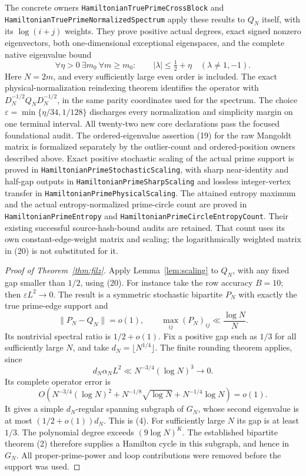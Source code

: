 The concrete owners \texttt{HamiltonianTruePrimeCrossBlock} and
\texttt{HamiltonianTruePrimeNormalizedSpectrum} apply these results
to \(Q_N\) itself, with its \(\log(i+j)\) weights.
They prove positive actual degrees, exact signed nonzero eigenvectors,
both one-dimensional exceptional eigenspaces, and the complete
native eigenvalue bound
\[
 \forall\eta>0\ \exists m_0\ \forall m\geq m_0:\qquad
 |\lambda|\leq\tfrac12+\eta\quad(\lambda\ne1,-1).
\]
Here \(N=2m\), and every sufficiently large even order is included.
The exact physical-normalization reindexing theorem identifies
the operator with \(D_N^{-1/2}Q_ND_N^{-1/2}\), in the same parity
coordinates used for the spectrum.
The choice \(\varepsilon=\min\{\eta/34,1/128\}\) discharges every
normalization and simplicity margin on one terminal interval.
All twenty-two new core declarations pass the focused foundational
audit. The ordered-eigenvalue assertion (19) for the raw Mangoldt
matrix is formalized separately by the outlier-count and ordered-position
owners described above.
Exact positive stochastic scaling of the actual prime support is
proved in \texttt{HamiltonianPrimeStochasticScaling}, with sharp
near-identity and half-gap outputs in
\texttt{HamiltonianPrimeSharpScaling} and lossless integer-vertex
transfer in \texttt{HamiltonianPrimePhysicalScaling}.
The attained entropy maximum and the actual entropy-normalized
prime-circle count are proved in
\texttt{HamiltonianPrimeEntropy} and
\texttt{HamiltonianPrimeCircleEntropyCount}.
Their existing successful source-hash-bound audits are retained.
That count uses its own constant-edge-weight matrix and scaling;
the logarithmically weighted matrix in (20) is not substituted for it.

\begin{proof}[Proof of Theorem~\ref{thm:filz}]
Apply Lemma~\ref{lem:scaling} to \(Q_N\), with any fixed gap
smaller than \(1/2\), using (20).
For instance take the row accuracy \(B=10\);
then \(\varepsilon L^2\to0\).
The result is a symmetric stochastic bipartite \(P_N\)
with exactly the true prime-edge support and
\[
 \|P_N-Q_N\|=o(1),\qquad
 \max_{ij}(P_N)_{ij}\ll\frac{\log N}{N}.
\]
Its nontrivial spectral ratio is \(1/2+o(1)\).
Fix a positive gap such as \(1/3\) for all sufficiently
large \(N\), and take \(d_N=\lfloor N^{1/4}\rfloor\).
The finite rounding theorem applies, since
\[
 d_N\alpha_N L^2\ll N^{-3/4}(\log N)^3\longrightarrow0.
\]
Its complete operator error is
\[
 O\left(N^{-3/4}(\log N)^2+
             N^{-1/8}\sqrt{\log N}+N^{-1/4}\log N\right)=o(1).
\]
It gives a simple \(d_N\)-regular spanning subgraph of
\(G_N\), whose second eigenvalue is at most
\((1/2+o(1))d_N\).
This is (4).
For sufficiently large \(N\) its gap is at least \(1/3\).
The polynomial degree exceeds \((9\log N)^K\).
The established bipartite theorem (2) therefore supplies
a Hamilton cycle in this subgraph, and hence in \(G_N\).
All proper-prime-power and loop contributions were removed
before the support was used.
\end{proof}

